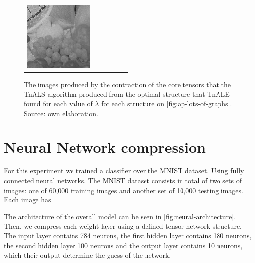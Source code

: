 \documentclass[11pt,a4paper,openright,oneside]{book}
\numberwithin{equation}{section}
\newcommand{\figref}[1]{\cref{#1}}
\begin{document}
{\begin{figure}[h]
\begin{adjustwidth}{-3cm}{-3cm}
\begin{tabular}{>{\centering\arraybackslash}m{1.5cm} m{2.5cm} m{2.5cm} m{2.5cm} m{2.5cm} m{2.5cm}}
        \includegraphics[width=\linewidth]{media/tnale/AAAfruits-comp5-ale-12.png} \\
   \end{tabular}
\end{adjustwidth}


    \caption{The images produced by the contraction of the core tensors that the TnALS algorithm
    produced from the optimal structure that TnALE found for each value of $\lambda$ for each structure on
    \figref{fig:ap-lots-of-graphs}. Source: own elaboration.}
    \label{fig:ap-lots-of-fruits}
\end{figure}


\section{Neural Network compression}

For this experiment we trained a classifier over the MNIST dataset. Using fully connected neural networks.
The MNIST dataset consists in total of two sets of images: one of 60,000 training images and another set of 10,000 testing images.
Each image has  


The architecture of the overall model can be seen in \ref{fig:neural-architecture}. Then, we compress each weight
layer using a defined tensor network structure. The input layer contains 784 neurons, the first hidden layer
contains 180 neurons, the second hidden layer 100 neurons and the output layer contains 10 neurons, which their output
determine the guess of the network.

}
\end{document}
